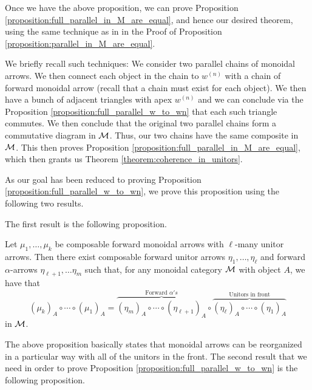 Once we have the above proposition, we can prove Proposition \ref{proposition:full_parallel_in_M_are_equal},
and hence our desired theorem, using 
the same technique as in in the Proof of Proposition \ref{proposition:parallel_in_M_are_equal}. 

We briefly recall such techniques: We consider two parallel chains of monoidal arrows. We then 
connect each object in the chain to $w^{(n)}$ with a chain of forward monoidal arrow (recall that 
a chain must exist for each object).
We then have a bunch of adjacent triangles with apex $w^{(n)}$ and 
we can conclude via the Proposition \ref{proposition:full_parallel_w_to_wn}
that each such triangle commutes. We then conclude that 
the original two parallel chains form 
a commutative diagram in $\mathcal{M}$. Thus, our two chains have the same composite in $\mathcal{M}$.
This then proves Proposition \ref{proposition:full_parallel_in_M_are_equal},
which then grants us Theorem \ref{theorem:coherence_in_unitors}. 

As our goal has been reduced to proving Proposition \ref{proposition:full_parallel_w_to_wn},
we prove this proposition using the following two results. 

The first result is the following proposition.
\begin{proposition}\label{proposition:arrow_reorganization}
    Let $\mu_1, \dots, \mu_k$ be composable forward monoidal arrows with 
    $\ell$-many unitor arrows.
    Then there exist composable forward unitor arrows 
    $\eta_1, \dots, \eta_{\ell}$ and forward $\alpha$-arrows $\eta_{\ell + 1}, \dots \eta_m$ 
    such that, for any monoidal category $\mathcal{M}$ with object $A$, we have that
    \[
        (\mu_k)_A \circ \cdots \circ (\mu_1)_A = \overbrace{(\eta_m)_A \circ \cdots \circ (\eta_{\ell + 1})_A}^{\text{Forward } \alpha's}\circ \overbrace{(\eta_{\ell})_A\circ \cdots \circ (\eta_1)_A}^{\text{Unitors in front}}
    \]
    in $\mathcal{M}$. 
\end{proposition} 


The above proposition basically states that monoidal arrows can be reorganized in a particular way 
with all of the unitors in the front.
The second result that we need in order to prove Proposition 
\ref{proposition:full_parallel_w_to_wn} is the following proposition. 

